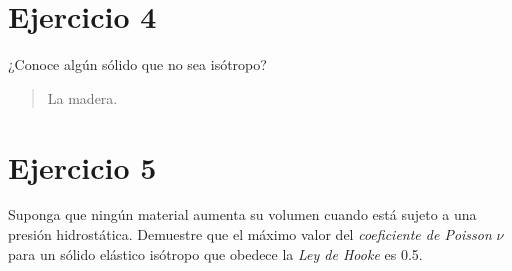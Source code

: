 \documentclass[a4paper,10pt,twoside,final,spanish]{article}
\begin{document}
\section*{Ejercicio 4}

¿Conoce algún sólido que no sea isótropo?

\dotfill

\begin{quote}
La madera.
\end{quote}

\section*{Ejercicio 5}

Suponga que ningún material aumenta su volumen cuando está sujeto a una presión 
hidrostática. Demuestre que el máximo valor del \textit{coeficiente de Poisson} $\nu$ para un sólido elástico isótropo que obedece la \textit{Ley de Hooke} es 0.5. 

\dotfill
\end{document}
